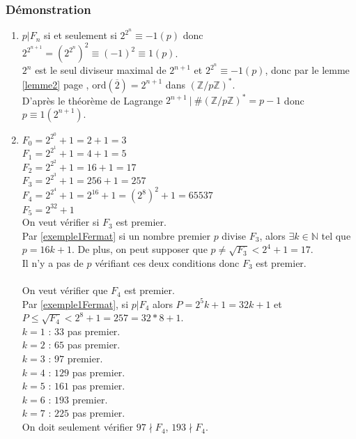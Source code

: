 \documentclass[a4paper,10pt]{book} %
\newcommand{\N}{\mathbb{N}}
\newcommand{\Z}{\mathbb{Z}}
\newcommand{\tq}{~|~}
\newcommand{\ord}{\mathrm{ord}}
\begin{document}
\subsubsection{Démonstration}
\begin{enumerate}
\item $p|F_n$ si et seulement si $2^{2^{n}} \equiv -1(p)$ donc $2^{2^{n+1}} = (2^{2^n})^2 \equiv (-1)^2 \equiv 1(p)$.\\

$2^n$ est le seul diviseur maximal de $2^{n+1}$ et $2^{2^n}\equiv -1(p)$, donc par le lemme \ref{lemme2} page \pageref{lemme2}, $\ord(\overline{2})=2^{n+1}$ dans $(\Z/p\Z)^*$.\\

D'après le théorème de Lagrange $2^{n+1}\tq\#(\Z/p\Z)^*=p-1$ donc $p\equiv 1(2^{n+1})$.\\

\item $F_0 = 2^{2^0}+1 = 2+1=3$ \\
$F_1 = 2^{2^1}+1 = 4+1 = 5$\\
$F_2 = 2^{2^2}+1 = 16+1=17$\\
$F_3 = 2^{2^3}+1 = 256+1=257$\\ 
$F_4 = 2^{2^4}+1=2^{16}+1=(2^8)^2+1=65537$\\
$F_5=2^{32}+1$\\

On veut vérifier si $F_3$ est premier.\\
Par \ref{exemple1Fermat} si un nombre premier $p$ divise $F_3$, alors $\exists k\in \N$ tel que $p=16k+1$. De plus, on peut supposer que $p\neq \sqrt{F_3} < 2^4+1=17$.\\
Il n'y a pas de $p$ vérifiant ces deux conditions donc $F_3$ est premier.\\\\

On veut vérifier que $F_4$ est premier.\\

Par \ref{exemple1Fermat}, si $p|F_4$ alors $P=2^5k+1=32k+1$ et $P\leq \sqrt{F_4}<2^8+1=257=32*8+1$.\\

$k=1$ : $33$ pas premier.\\
$k=2$ : $65$ pas premier.\\
$k=3$ : $97$ premier.\\
$k=4$ : $129$ pas premier.\\
$k=5$ : $161$ pas premier.\\
$k=6$ : $193$ premier.\\
$k=7$ : $225$ pas premier.\\

On doit seulement vérifier $97\nmid  F_4$, $193\nmid F_4$.
\end{enumerate}
\end{document}
